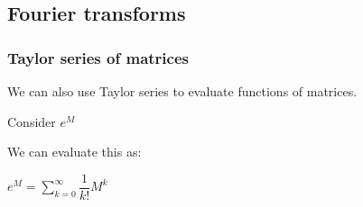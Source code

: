 
\subsection{Fourier transforms}

\subsubsection{Taylor series of matrices}

We can also use Taylor series to evaluate functions of matrices.

Consider \(e^M\)

We can evaluate this as:

\(e^M=\sum_{k=0}^\infty \dfrac{1}{k!}M^k\)

